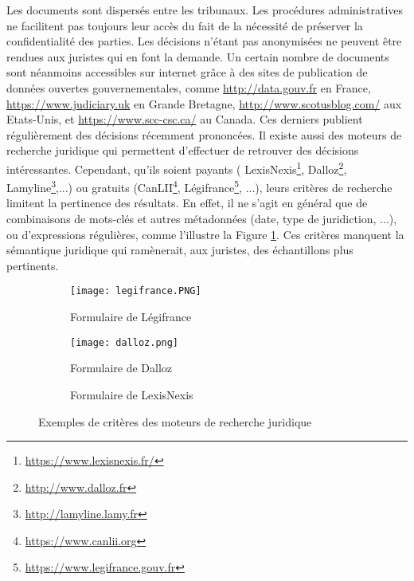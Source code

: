Les documents sont dispersés entre les tribunaux. Les procédures administratives ne facilitent pas toujours leur accès du fait de la nécessité de préserver la confidentialité des parties. Les décisions n'étant pas anonymisées ne peuvent être rendues aux juristes qui en font la demande. Un certain nombre de documents sont néanmoins accessibles sur internet grâce à des sites de publication de données ouvertes gouvernementales, comme \url{http://data.gouv.fr} en France, \url{https://www.judiciary.uk} en Grande Bretagne, \url{http://www.scotusblog.com/} aux Etats-Unis, et \url{https://www.scc-csc.ca/} au Canada. Ces derniers publient régulièrement des décisions récemment prononcées.  Il existe aussi des moteurs de recherche juridique qui permettent d'effectuer de retrouver des décisions intéressantes. Cependant, qu'ils soient payants ( LexisNexis\footnote{\url{https://www.lexisnexis.fr/}}, Dalloz\footnote{\url{http://www.dalloz.fr}}, Lamyline\footnote{\url{http://lamyline.lamy.fr}},...) ou gratuits (CanLII\footnote{\url{https://www.canlii.org}}, Légifrance\footnote{\url{https://www.legifrance.gouv.fr}}, ...), leurs critères de recherche limitent la pertinence des résultats. En effet, il ne s'agit en général que de combinaisons de mots-clés et autres métadonnées (date, type de juridiction, ...), ou d'expressions régulières, comme l'illustre la Figure \ref{fig:intro:juriSearchForm}. Ces critères manquent la sémantique juridique qui ramènerait, aux juristes, des échantillons plus pertinents. 

\begin{figure}
	\centering
	\begin{subfigure}[t]{0.95\textwidth}
		\centering
		\texttt{[image: legifrance.PNG]}
		\caption{Formulaire de Légifrance}
	\end{subfigure}%

	\begin{subfigure}[t]{0.45\textwidth}
		\centering
		\texttt{[image: dalloz.png]}
		\caption{Formulaire de Dalloz}
	\end{subfigure}\hfill
	\begin{subfigure}[t]{0.55\textwidth}
		\centering
		\caption{Formulaire de LexisNexis}
	\end{subfigure}%
	\caption{Exemples de critères des moteurs de recherche juridique}\label{fig:intro:juriSearchForm}
\end{figure}

